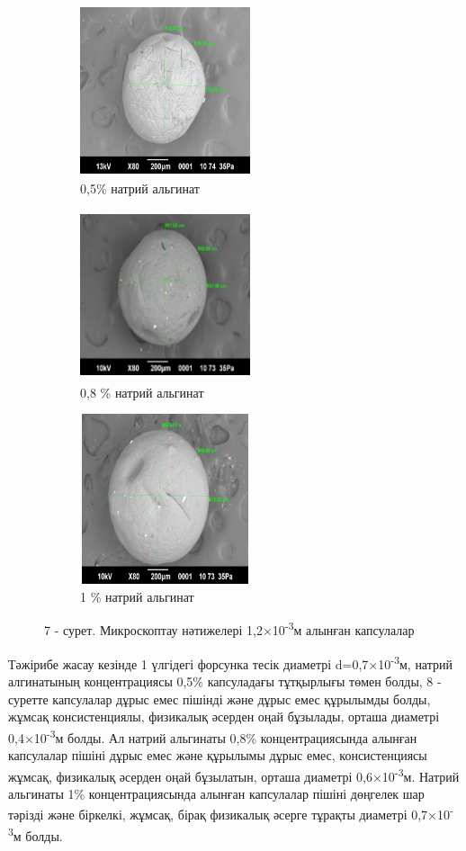 \begin{figure}[H]
	\centering
	\begin{subfigure}[b]{0.3\textwidth}
		\centering
		\includegraphics[width=5cm,height=5cm]{media/pish/image32}
		\caption*{0,5\% натрий альгинат}
	\end{subfigure}
	\hfill
	\begin{subfigure}[b]{0.3\textwidth}
		\centering
		\includegraphics[width=5cm,height=5cm]{media/pish/image33}
		\caption*{0,8 \% натрий альгинат}
	\end{subfigure}
	\hfill
	\begin{subfigure}[b]{0.3\textwidth}
		\centering
		\includegraphics[width=5cm,height=5cm]{media/pish/image34}
		\caption*{1 \% натрий альгинат}
	\end{subfigure}
	\caption*{7 - сурет. Микроскоптау нәтижелері 1,2×10\textsuperscript{-3}м алынған капсулалар}
\end{figure}

Тәжірибе жасау кезінде 1 үлгідегі форсунка тесік диаметрі
d=0,7×10\textsuperscript{-3}м, натрий алгинатының концентрациясы 0,5\%
капсуладағы тұтқырлығы төмен болды, 8 - суретте капсулалар дұрыс емес
пішінді және дұрыс емес құрылымды болды, жұмсақ консистенциялы,
физикалық әсерден оңай бұзылады, орташа диаметрі
0,4×10\textsuperscript{-3}м болды. Ал натрий альгинаты 0,8\%
концентрациясында алынған капсулалар пішіні дұрыс емес және құрылымы
дұрыс емес, консистенциясы жұмсақ, физикалық әсерден оңай бұзылатын,
орташа диаметрі 0,6×10\textsuperscript{-3}м. Натрий альгинаты 1\%
концентрациясында алынған капсулалар пішіні дөңгелек шар тәрізді және
біркелкі, жұмсақ, бірақ физикалық әсерге тұрақты диаметрі
0,7×10\textsuperscript{-3}м болды.

